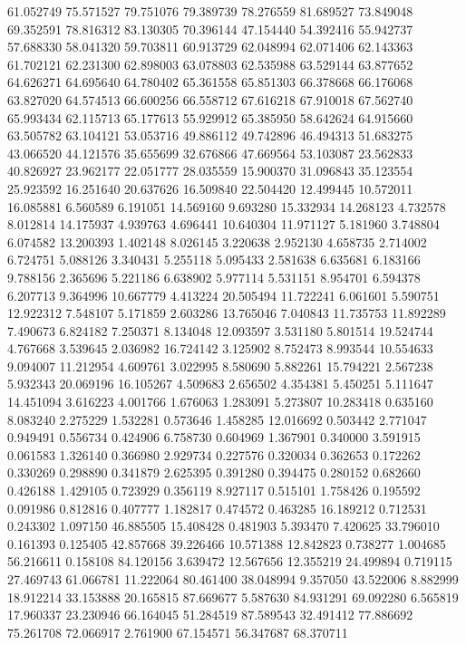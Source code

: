 61.052749
75.571527
79.751076
79.389739
78.276559
81.689527
73.849048
69.352591
78.816312
83.130305
70.396144
47.154440
54.392416
55.942737
57.688330
58.041320
59.703811
60.913729
62.048994
62.071406
62.143363
61.702121
62.231300
62.898003
63.078803
62.535988
63.529144
63.877652
64.626271
64.695640
64.780402
65.361558
65.851303
66.378668
66.176068
63.827020
64.574513
66.600256
66.558712
67.616218
67.910018
67.562740
65.993434
62.115713
65.177613
55.929912
65.385950
58.642624
64.915660
63.505782
63.104121
53.053716
49.886112
49.742896
46.494313
51.683275
43.066520
44.121576
35.655699
32.676866
47.669564
53.103087
23.562833
40.826927
23.962177
22.051777
28.035559
15.900370
31.096843
35.123554
25.923592
16.251640
20.637626
16.509840
22.504420
12.499445
10.572011
16.085881
6.560589
6.191051
14.569160
9.693280
15.332934
14.268123
4.732578
8.012814
14.175937
4.939763
4.696441
10.640304
11.971127
5.181960
3.748804
6.074582
13.200393
1.402148
8.026145
3.220638
2.952130
4.658735
2.714002
6.724751
5.088126
3.340431
5.255118
5.095433
2.581638
6.635681
6.183166
9.788156
2.365696
5.221186
6.638902
5.977114
5.531151
8.954701
6.594378
6.207713
9.364996
10.667779
4.413224
20.505494
11.722241
6.061601
5.590751
12.922312
7.548107
5.171859
2.603286
13.765046
7.040843
11.735753
11.892289
7.490673
6.824182
7.250371
8.134048
12.093597
3.531180
5.801514
19.524744
4.767668
3.539645
2.036982
16.724142
3.125902
8.752473
8.993544
10.554633
9.094007
11.212954
4.609761
3.022995
8.580690
5.882261
15.794221
2.567238
5.932343
20.069196
16.105267
4.509683
2.656502
4.354381
5.450251
5.111647
14.451094
3.616223
4.001766
1.676063
1.283091
5.273807
10.283418
0.635160
8.083240
2.275229
1.532281
0.573646
1.458285
12.016692
0.503442
2.771047
0.949491
0.556734
0.424906
6.758730
0.604969
1.367901
0.340000
3.591915
0.061583
1.326140
0.366980
2.929734
0.227576
0.320034
0.362653
0.172262
0.330269
0.298890
0.341879
2.625395
0.391280
0.394475
0.280152
0.682660
0.426188
1.429105
0.723929
0.356119
8.927117
0.515101
1.758426
0.195592
0.091986
0.812816
0.407777
1.182817
0.474572
0.463285
16.189212
0.712531
0.243302
1.097150
46.885505
15.408428
0.481903
5.393470
7.420625
33.796010
0.161393
0.125405
42.857668
39.226466
10.571388
12.842823
0.738277
1.004685
56.216611
0.158108
84.120156
3.639472
12.567656
12.355219
24.499894
0.719115
27.469743
61.066781
11.222064
80.461400
38.048994
9.357050
43.522006
8.882999
18.912214
33.153888
20.165815
87.669677
5.587630
84.931291
69.092280
6.565819
17.960337
23.230946
66.164045
51.284519
87.589543
32.491412
77.886692
75.261708
72.066917
2.761900
67.154571
56.347687
68.370711
